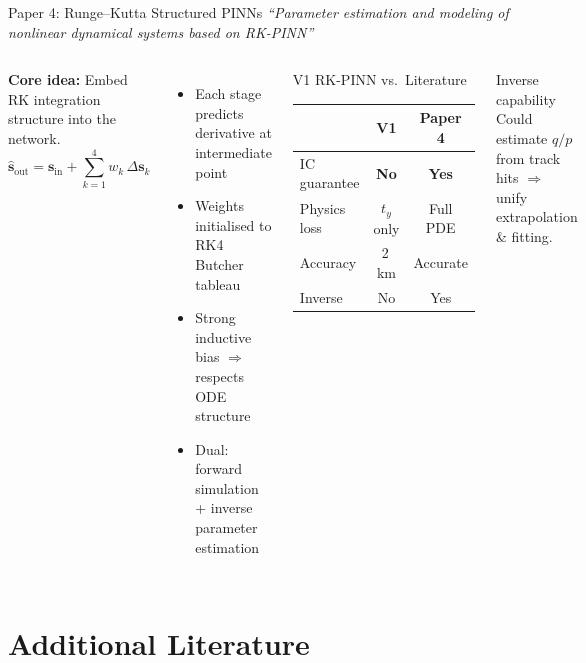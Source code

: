 \documentclass[aspectratio=169, 11pt]{beamer}
\newcommand{\vb}[1]{\bm{#1}}
\begin{document}
\begin{frame}{Paper 4: Runge--Kutta Structured PINNs}
  \textit{``Parameter estimation and modeling of nonlinear dynamical systems based on RK-PINN''}

  \begin{columns}[T]
    \textbf{Core idea:} Embed RK integration structure into the network.
    \[
      \hat{\vb{s}}_\text{out} = \vb{s}_\text{in} + \sum_{k=1}^{4} w_k\,\Delta\vb{s}_k
    \]
    \begin{itemize}
      \item Each stage predicts derivative at intermediate point
      \item Weights initialised to RK4 Butcher tableau
      \item Strong inductive bias $\Rightarrow$ respects ODE structure
      \item Dual: forward simulation + inverse parameter estimation
    \end{itemize}

    \begin{block}{V1 RK-PINN vs.\ Literature}
      \centering\small
      \begin{tabular}{lcc}
        \toprule
        & \textbf{V1} & \textbf{Paper 4} \\
        \midrule
        IC guarantee & \textcolor{rk4red}{\textbf{No}} & \textcolor{nngreen}{\textbf{Yes}} \\
        Physics loss & $t_y$ only & Full PDE \\
        Accuracy & 2\,km & Accurate \\
        Inverse & No & Yes \\
        \bottomrule
      \end{tabular}
    \end{block}

    \begin{exampleblock}{Inverse capability}
      Could estimate $q/p$ from track hits $\Rightarrow$ unify extrapolation \& fitting.
    \end{exampleblock}
  \end{columns}
\end{frame}

\section{Additional Literature}
\end{document}
